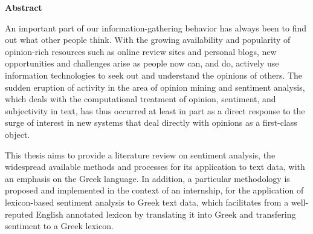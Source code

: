 \begin{center}
\textbf{\large Abstract}
\end{center}

An important part of our information-gathering behavior has always been
to find out what other people think.
With the growing availability and popularity of opinion-rich resources
such as online review sites and personal blogs,
new opportunities and challenges arise
as people now can, and do, actively use information technologies
to seek out and understand the opinions of others.
The sudden eruption of activity
in the area of opinion mining and sentiment analysis,
which deals with the computational treatment of opinion,
sentiment, and subjectivity in text,
has thus occurred at least in part
as a direct response to the surge of interest in new systems
that deal directly with opinions as a first-class object.

This thesis aims to provide a literature review on sentiment analysis,
the widespread available methods and processes
for its application to text data,
with an emphasis on the Greek language.
In addition, a particular methodology is proposed and implemented
in the context of an internship,
for the application of lexicon-based sentiment analysis to Greek text data,
which facilitates from a well-reputed English annotated lexicon
by translating it into Greek and transfering sentiment to a Greek lexicon.

